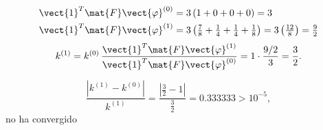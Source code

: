 \begin{align*}
	\vect{1}^T\mat{F}\vect{\varphi}^{(0)} &= 3\,(1 + 0 + 0 + 0) = 3\\
	\vect{1}^T\mat{F}\vect{\varphi}^{(1)} &= 3\left(\tfrac78 + \tfrac14 + \tfrac14 + \tfrac18\right) = 3\left(\tfrac{12}{8}\right) = \tfrac92
\end{align*}
\[
k^{(1)} = k^{(0)}\,\frac{\vect{1}^T\mat{F}\vect{\varphi}^{(1)}}{\vect{1}^T\mat{F}\vect{\varphi}^{(0)}}
= 1\cdot\frac{9/2}{3} = \frac32 .
\]

\[
\frac{\left|k^{(1)} - k^{(0)}\right|}{k^{(1)}} = \frac{\left|\frac32 - 1\right|}{\frac32} = 0.333333 > 10^{-5},
\]
no ha convergido

%
